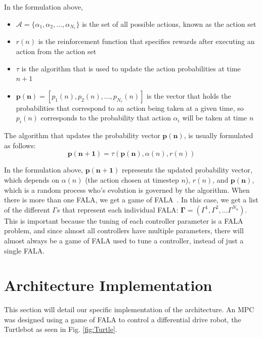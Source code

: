 \documentclass[conference]{IEEEtran}
\begin{document}
In the formulation above, 

\begin{itemize}
    \item $\mathcal{A} = \{\alpha_{1}, \alpha_{2},...,\alpha_{N_{r}}\}$ is the set of all possible actions, known as the action set
    \item $r(n)$ is the reinforcement function that specifies rewards after executing an action from the action set
    \item $\tau$ is the algorithm that is used to update the action probabilities at time $n+1$
    \item $\mathbf{p(n)} = [p_{1}(n), p_{2}(n),...,p_{N_{r}}(n)]$ is the vector that holds the probabilities that correspond to an action being taken at a given time, so $p_{i}(n)$ corresponds to the probability that action $\alpha_{i}$ will be taken at time $n$
\end{itemize}

The algorithm that updates the probability vector $\mathbf{p(n)}$, is usually formulated as follows: $$\mathbf{p(n+1)}=\tau(\mathbf{p(n)}, \alpha(n), r(n))$$

In the formulation above, $\mathbf{p(n+1)}$ represents the updated probability vector, which depends on $\alpha(n)$ (the action chosen at timestep $n$), $r(n)$, and $\mathbf{p(n)}$, which is a random process who's evolution is governed by the algorithm. When there is more than one FALA, we get a game of FALA~\cite{Narendra-1989,thathachar:2004}. In this case, we get a list of the different $\Gamma s$ that represent each individual FALA: $\mathbf{\Gamma} = (\Gamma^{1}, \Gamma^{2}, ... \Gamma^{N_{a}})$. This is important because the tuning of each controller parameter is a FALA problem, and since almost all controllers have multiple parameters, there will almost always be a game of FALA used to tune a controller, instead of just a single FALA.

\section{Architecture Implementation} \label{sec:SimulLearn}

This section will detail our specific implementation of the architecture. An MPC was designed using a game of FALA to control a differential drive robot, the Turtlebot as seen in Fig. \ref{fig:Turtle}.
\end{document}
